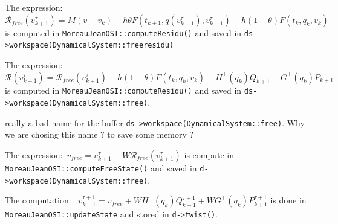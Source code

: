 The expression:~$\mathcal R_{free}(v^\tau_{k+1}) = M(v-v_k) - h  \theta F(t_{k+1}, q(v^\tau_{k+1}),v^\tau_{k+1}) - h (1- \theta) F(t_{k}, q_{k},v_{k})$ is computed in {\tt MoreauJeanOSI::computeResidu()} and saved in {\tt ds->workspace(DynamicalSystem::freeresidu)}


The expression:~$\mathcal R(v^\tau_{k+1}) =\mathcal R_{free}(v^\tau_{k+1}) - h (1- \theta) F(t_{k}, q_{k},v_{k}) - H^\top(\bar q_k) Q_{k+1} - G^\top(\bar q_k) P_{k+1}  $ is computed in {\tt MoreauJeanOSI::computeResidu()} and saved in {\tt ds->workspace(DynamicalSystem::free)}.
\begin{ndrva}
  really a bad name for the buffer {\tt ds->workspace(DynamicalSystem::free)}. Why we are chosing this name ? to save some memory ?
\end{ndrva}


The expression:~$v_{free}  = v^{\tau}_{k+1} - W  \mathcal R_{free}(v^\tau_{k+1})$ is compute in {\tt MoreauJeanOSI::computeFreeState()} and saved in {\tt d->workspace(DynamicalSystem::free)}.



The computation:~ $v^{\tau+1}_{k+1} = v_{free} + W   H^\top(\bar q_k) Q^{\tau+1}_{k+1} + W G^\top(\bar q_k) P^{\tau+1}_{k+1}$ is done in {\tt MoreauJeanOSI::updateState} and stored in {\tt d->twist()}.\\


